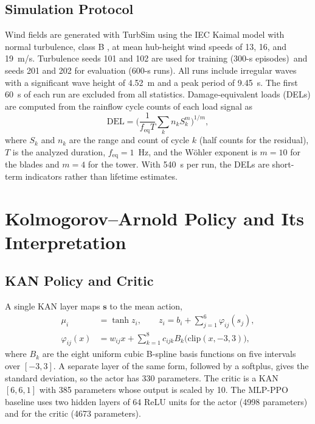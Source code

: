 \documentclass[journal]{IEEEtran}
\providecommand{\TrainWinds}{Turbulence seeds 101 and 102 are used for training (300-s episodes)}
\begin{document}
\subsection{Simulation Protocol}
Wind fields are generated with TurbSim \cite{jonkman2009turbsim} using the IEC Kaimal model with
normal turbulence, class B \cite{iec61400}, at mean hub-height wind speeds of 13, 16, and 19~m/s.
\TrainWinds\ and seeds 201 and 202 for
evaluation (600-s runs). All runs include irregular waves with a significant wave height of
4.52~m and a peak period of 9.45~s. The first 60~s of each run are excluded from all statistics.
Damage-equivalent loads (DELs) are computed from the rainflow cycle counts \cite{astm1049} of
each load signal as
\begin{equation}
\mathrm{DEL} = \Big(\frac{1}{f_{\mathrm{eq}} T}\sum_k n_k S_k^m\Big)^{1/m},
\end{equation}
where $S_k$ and $n_k$ are the range and count of cycle $k$ (half counts for the residual), $T$ is
the analyzed duration, $f_{\mathrm{eq}} = 1$~Hz, and the W\"ohler exponent is $m = 10$ for the
blades and $m = 4$ for the tower. With 540~s per run, the DELs are short-term indicators rather
than lifetime estimates.

\section{Kolmogorov--Arnold Policy and Its Interpretation}
\subsection{KAN Policy and Critic}
A single KAN layer maps $\mathbf{s}$ to the mean action,
\begin{equation}
\begin{aligned}
\mu_i &= \tanh z_i, \qquad z_i = b_i + \sum_{j=1}^{6} \varphi_{ij}(s_j), \\
\varphi_{ij}(x) &= w_{ij}x + \sum_{k=1}^{8} c_{ijk} B_k\big(\mathrm{clip}(x,-3,3)\big),
\end{aligned}
\label{eq:kan}
\end{equation}
where $B_k$ are the eight uniform cubic B-spline basis functions on five intervals over $[-3,3]$.
A separate layer of the same form, followed by a softplus, gives the standard deviation, so the
actor has 330 parameters. The critic is a KAN $[6,6,1]$ with 385 parameters whose output is scaled
by 10. The MLP-PPO baseline uses two hidden layers of 64 ReLU units for the actor (4998
parameters) and for the critic (4673 parameters).
\end{document}
